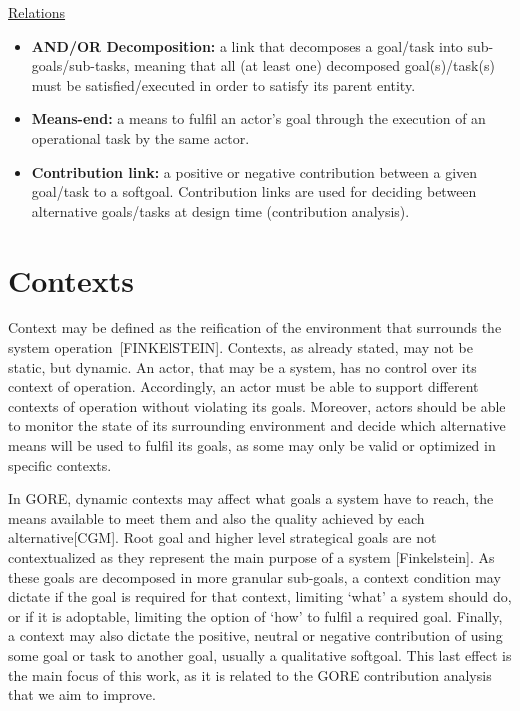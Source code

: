 \large{\underline{Relations}}

\begin{itemize}

\item \textbf{AND/OR Decomposition:} a link that decomposes a goal/task into sub-goals/sub-tasks, meaning that all (at least one) decomposed goal(s)/task(s) must be satisfied/executed in order to satisfy its parent entity. 
\medskip

\item \textbf{Means-end:} a means to fulfil an actor's goal through the execution of an operational task by the same actor.
\medskip

\item \textbf{Contribution link:} a positive or negative contribution between a given goal/task to a softgoal. Contribution links are used for deciding between alternative goals/tasks at design time (contribution analysis).

\end{itemize}

\section{Contexts}

Context may be defined as the reification of the environment that surrounds the system operation~[FINKElSTEIN]. Contexts, as already stated, may not be static, but dynamic. An actor, that may be a system, has no control over its context of operation. Accordingly, an actor must be able to support different contexts of operation without violating its goals. Moreover, actors should be able to monitor the state of its surrounding environment and decide which alternative means will be used to fulfil its goals, as some may only be valid or optimized in specific contexts.

In GORE, dynamic contexts may affect what goals a system have to reach, the means available to meet them and also the quality achieved by each alternative[CGM]. Root goal and higher level strategical goals are not contextualized as they represent the main purpose of a system [Finkelstein]. As these goals are decomposed in more granular sub-goals, a context condition may dictate if the goal is required for that context, limiting `what' a system should do, or if it is adoptable, limiting the option of `how' to fulfil a required goal. Finally, a context may also dictate the positive, neutral or negative contribution of using some goal or task to another goal, usually a qualitative softgoal. This last effect is the main focus of this work, as it is related to the GORE contribution analysis that we aim to improve.
 

